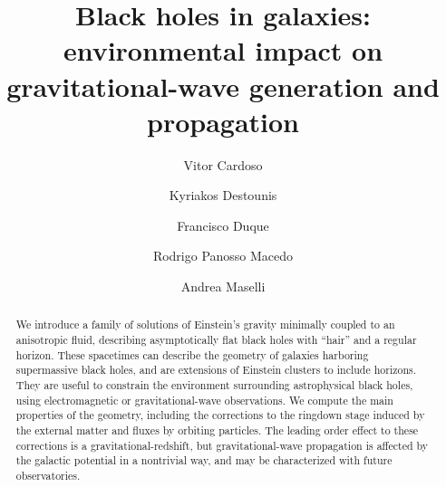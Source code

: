 \documentclass[twocolumn,preprintnumbers,nofootinbib,prd,superscriptaddress,aps]{revtex4-1}
\begin{document}
\title{Black holes in galaxies: environmental impact on gravitational-wave generation and propagation}
%

\author{Vitor Cardoso}
%
%
%
\author{Kyriakos Destounis}
%
\author{Francisco Duque}
%
\author{Rodrigo Panosso Macedo}
%
\author{Andrea Maselli}
%


\begin{abstract} 
We introduce a family of solutions of Einstein's gravity minimally coupled to an anisotropic fluid, describing asymptotically flat black holes with ``hair'' and a regular horizon. These spacetimes can describe the geometry of galaxies harboring supermassive black holes, and are extensions of Einstein clusters to include horizons. They are useful to constrain the environment surrounding astrophysical black holes, using electromagnetic or gravitational-wave observations. We compute the main properties of the geometry, including the corrections to the ringdown stage induced by the external matter and fluxes by orbiting particles. The leading order effect to these corrections is a gravitational-redshift, but gravitational-wave propagation is affected by the galactic potential in a nontrivial way, and may be characterized with future observatories.
\end{abstract}
\maketitle




\end{document}
